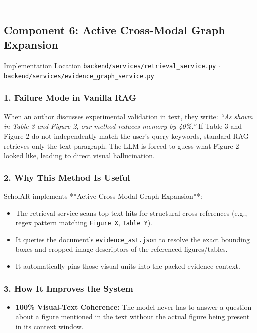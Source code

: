 \documentclass[11pt,a4paper]{article}
\begin{document}
---

\subsection{Component 6: Active Cross-Modal Graph Expansion}
\begin{codebox}{Implementation Location}
\texttt{backend/services/retrieval\_service.py} $\cdot$ \texttt{backend/services/evidence\_graph\_service.py}
\end{codebox}

\subsubsection{1. Failure Mode in Vanilla RAG}
When an author discusses experimental validation in text, they write: \emph{``As shown in Table 3 and Figure 2, our method reduces memory by 40\%.''} If Table 3 and Figure 2 do not independently match the user's query keywords, standard RAG retrieves only the text paragraph. The LLM is forced to guess what Figure 2 looked like, leading to direct visual hallucination.

\subsubsection{2. Why This Method Is Useful}
ScholAR implements **Active Cross-Modal Graph Expansion**:
\begin{itemize}[leftmargin=*]
    \item The retrieval service scans top text hits for structural cross-references (e.g., regex pattern matching \texttt{Figure X}, \texttt{Table Y}).
    \item It queries the document's \texttt{evidence\_ast.json} to resolve the exact bounding boxes and cropped image descriptors of the referenced figures/tables.
    \item It automatically pins those visual units into the packed evidence context.
\end{itemize}

\subsubsection{3. How It Improves the System}
\begin{itemize}[leftmargin=*]
    \item \textbf{100\% Visual-Text Coherence:} The model never has to answer a question about a figure mentioned in the text without the actual figure being present in its context window.
\end{itemize}
\end{document}
